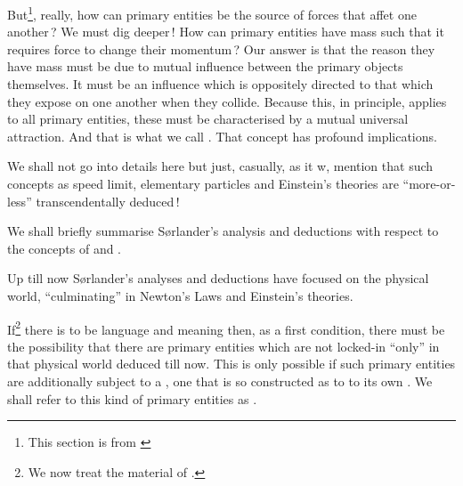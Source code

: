
\begynd
\pind But\footnote{This section is from \cite[Pages
     168--173]{kaisorlander2016}}, really, how can primary entities be
     the source of forces  \nyl that affet one another\,?
\begynd
\pind We must dig deeper\,!
\pind How can primary entities have mass such that it requires force
      to change their momentum\,?
\pind Our answer is that the reason they have mass \nyl
      must be due to mutual influence between the primary objects themselves.
\pind It must be an influence which is oppositely directed to that \nyl
      which they expose on one another when they collide.
\pind Because this, in principle, applies to all primary entities, \nyl
      these must be characterised by a mutual universal attraction.
\afslut
\mnewfoil
\pind And that is what we call .
%
%
\pind That concept has profound implications.
\afslut

\treprikker

\noindent
\begynd
\pind We shall not go into details here
\begynd
\pind but just, casually, as it w, mention that such concepts as
\pind speed limit, elementary particles and
      Einstein's theories \nyl are ``more-or-less'' transcendentally deduced\,!
\afslut
\afslut

\label{Purpose Life and Evolution}

\begynd
\pind We shall briefly summarise S{\o}rlander's analysis and
      deductions with respect to the concepts of
       and %
      . %

\begynd
\pind Up till now S{\o}rlander's analyses and deductions have focused
      on the physical world, ``culminating'' in Newton's Laws and
      Einstein's theories.
      
\pind If\footnote{\LLLL We now treat the material of \cite[]{kaisorlander2016}.} there is to be
      language  and meaning 
       then, as a first condition, there must
      be the possibility that there are primary entities which are not
      locked-in ``only'' in that physical world deduced till now.
\pind This is only possible if such primary entities are additionally
      subject to a ,
      one that is so constructed as to  to
       its own .
\afslut
\pind We shall refer to this kind of primary entities as . %
\afslut

